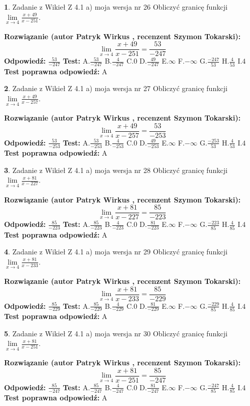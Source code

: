 \documentclass[12pt, a4paper]{article}
\theoremstyle{definition} %
\newtheorem{zad}{}
\newcommand{\zadStart}[1]{\begin{zad}#1\newline}
\newcommand{\zadStop}{\end{zad}}
\newcommand{\rozwStart}[2]{\noindent \textbf{Rozwiązanie (autor #1 , recenzent #2): }\newline}
\newcommand{\rozwStop}{\newline}
\newcommand{\odpStart}{\noindent \textbf{Odpowiedź:}\newline}
\newcommand{\odpStop}{\newline}
\newcommand{\testStart}{\noindent \textbf{Test:}\newline}
\newcommand{\testStop}{\newline}
\newcommand{\kluczStart}{\noindent \textbf{Test poprawna odpowiedź:}\newline}
\newcommand{\kluczStop}{\newline}
\begin{document}
\zadStart{Zadanie z Wikieł Z 4.1 a) moja wersja nr 26}
Obliczyć granicę funkcji $\lim\limits_{x\to4}\frac{x+49}{x-251}$.
\zadStop
\rozwStart{Patryk Wirkus}{Szymon Tokarski}
$$\lim\limits_{x\to4}\frac{x+49}{x-251} = \frac{53}{-247}$$
\rozwStop
\odpStart
$\frac{53}{-247}$
\odpStop
\testStart
A.$\frac{53}{-247}$
B.$\frac{4}{-247}$
C.$0$
D.$\frac{49}{-247}$
E.$\infty$
F.$-\infty$
G.$\frac{-247}{53}$
H.$\frac{4}{53}$
I.$4$
\testStop
\kluczStart
A
\kluczStop



\zadStart{Zadanie z Wikieł Z 4.1 a) moja wersja nr 27}
Obliczyć granicę funkcji $\lim\limits_{x\to4}\frac{x+49}{x-257}$.
\zadStop
\rozwStart{Patryk Wirkus}{Szymon Tokarski}
$$\lim\limits_{x\to4}\frac{x+49}{x-257} = \frac{53}{-253}$$
\rozwStop
\odpStart
$\frac{53}{-253}$
\odpStop
\testStart
A.$\frac{53}{-253}$
B.$\frac{4}{-253}$
C.$0$
D.$\frac{49}{-253}$
E.$\infty$
F.$-\infty$
G.$\frac{-253}{53}$
H.$\frac{4}{53}$
I.$4$
\testStop
\kluczStart
A
\kluczStop



\zadStart{Zadanie z Wikieł Z 4.1 a) moja wersja nr 28}
Obliczyć granicę funkcji $\lim\limits_{x\to4}\frac{x+81}{x-227}$.
\zadStop
\rozwStart{Patryk Wirkus}{Szymon Tokarski}
$$\lim\limits_{x\to4}\frac{x+81}{x-227} = \frac{85}{-223}$$
\rozwStop
\odpStart
$\frac{85}{-223}$
\odpStop
\testStart
A.$\frac{85}{-223}$
B.$\frac{4}{-223}$
C.$0$
D.$\frac{81}{-223}$
E.$\infty$
F.$-\infty$
G.$\frac{-223}{85}$
H.$\frac{4}{85}$
I.$4$
\testStop
\kluczStart
A
\kluczStop



\zadStart{Zadanie z Wikieł Z 4.1 a) moja wersja nr 29}
Obliczyć granicę funkcji $\lim\limits_{x\to4}\frac{x+81}{x-233}$.
\zadStop
\rozwStart{Patryk Wirkus}{Szymon Tokarski}
$$\lim\limits_{x\to4}\frac{x+81}{x-233} = \frac{85}{-229}$$
\rozwStop
\odpStart
$\frac{85}{-229}$
\odpStop
\testStart
A.$\frac{85}{-229}$
B.$\frac{4}{-229}$
C.$0$
D.$\frac{81}{-229}$
E.$\infty$
F.$-\infty$
G.$\frac{-229}{85}$
H.$\frac{4}{85}$
I.$4$
\testStop
\kluczStart
A
\kluczStop



\zadStart{Zadanie z Wikieł Z 4.1 a) moja wersja nr 30}
Obliczyć granicę funkcji $\lim\limits_{x\to4}\frac{x+81}{x-251}$.
\zadStop
\rozwStart{Patryk Wirkus}{Szymon Tokarski}
$$\lim\limits_{x\to4}\frac{x+81}{x-251} = \frac{85}{-247}$$
\rozwStop
\odpStart
$\frac{85}{-247}$
\odpStop
\testStart
A.$\frac{85}{-247}$
B.$\frac{4}{-247}$
C.$0$
D.$\frac{81}{-247}$
E.$\infty$
F.$-\infty$
G.$\frac{-247}{85}$
H.$\frac{4}{85}$
I.$4$
\testStop
\kluczStart
A
\kluczStop
\end{document}
